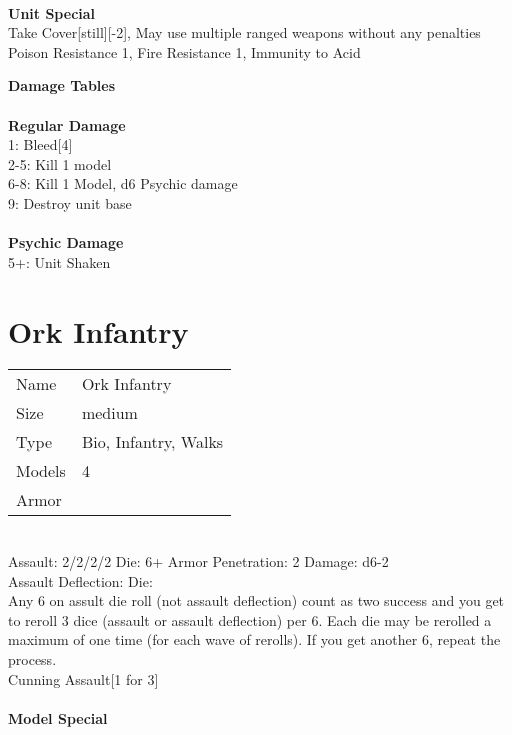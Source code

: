\ \\



{\bf Unit Special} \\
Take Cover[still][-2], May use multiple ranged weapons without any penalties\\ Poison Resistance 1, Fire Resistance 1, Immunity to Acid

{\bf Damage Tables} \\
\ \\ {\bf Regular Damage } \\
1: Bleed[4] \\
2-5: Kill 1 model \\
6-8: Kill 1 Model, d6 Psychic damage \\
9: Destroy unit base \\
\ \\ {\bf Psychic Damage } \\
5+: Unit Shaken \\










\pagebreak

\section{ Ork Infantry }

\begin{tabular}{ll}
  Name & Ork Infantry \\
  Size & medium\\
  Type & Bio, Infantry, Walks\\
  Models & 4\\
  Armor & \\
\end{tabular}



\ \\
Assault: 2/2/2/2 Die: 6+ Armor Penetration: 2 Damage: d6-2 \\
Assault Deflection:  Die: \\
\indent Any 6 on assult die roll (not assault deflection) count as two success and you get to reroll 3 dice (assault or assault deflection) per 6. Each die may be rerolled a maximum of one time (for each wave of rerolls). If you get another 6, repeat the process. \\ Cunning Assault[1 for 3] \\
\ \\
{\bf Model Special} \\

